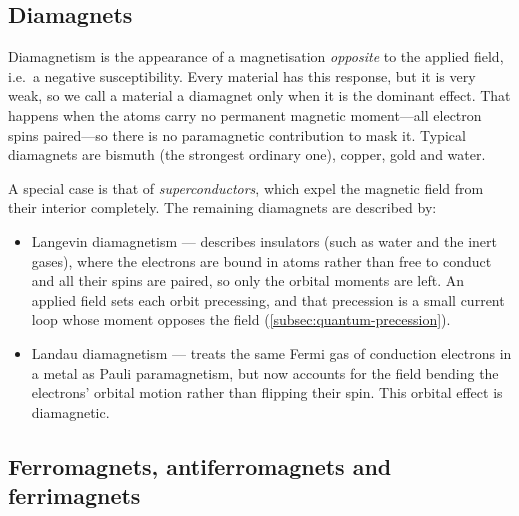    \subsection{Diamagnets}\label{sec:diamagnets}

        Diamagnetism is the appearance of a magnetisation \emph{opposite} to the applied field, i.e.\ a negative susceptibility. Every material has this response, but it is very weak, so we call a material a diamagnet only when it is the dominant effect. That happens when the atoms carry no permanent magnetic moment---all electron spins paired---so there is no paramagnetic contribution to mask it. Typical diamagnets are bismuth (the strongest ordinary one), copper, gold and water.

        A special case is that of \emph{superconductors}, which expel the magnetic field from their interior completely. The remaining diamagnets are described by:

        \begin{itemize}
            \item Langevin diamagnetism --- describes insulators (such as water and the inert gases), where the electrons are bound in atoms rather than free to conduct and all their spins are paired, so only the orbital moments are left. An applied field sets each orbit precessing, and that precession is a small current loop whose moment opposes the field (\cref{subsec:quantum-precession}).
            \item Landau diamagnetism --- treats the same Fermi gas of conduction electrons in a metal as Pauli paramagnetism, but now accounts for the field bending the electrons' orbital motion rather than flipping their spin. This orbital effect is diamagnetic.
        \end{itemize}

    \subsection{Ferromagnets, antiferromagnets and ferrimagnets}

